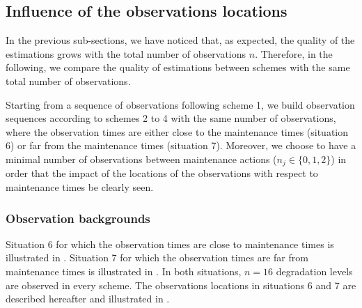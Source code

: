 \subsection{Influence of the observations locations}

In the previous sub-sections, we have noticed that, as expected, the quality of the estimations grows with the total number of observations $n$. Therefore, in the following, we compare the quality of estimations between schemes with the same total number of observations.

Starting from a sequence of observations following scheme 1, we  build observation sequences according to schemes 2 to 4 with the same number of observations, where the observation times are either close to the maintenance times (situation 6) or far from the maintenance times (situation 7). 
Moreover, we choose to have a minimal number of observations between maintenance actions ($n_j \in \{0,1,2\}$) in order that the impact of the locations of the observations with respect to maintenance times be clearly seen.


\subsubsection{Observation backgrounds}
Situation 6 for which the observation times are close to maintenance times is illustrated in .
Situation 7 for which the observation times are far from maintenance times is illustrated in .
In both situations, $n=16$ degradation levels are observed in every scheme.
The observations locations in situations 6 and 7 are described hereafter and illustrated in .

